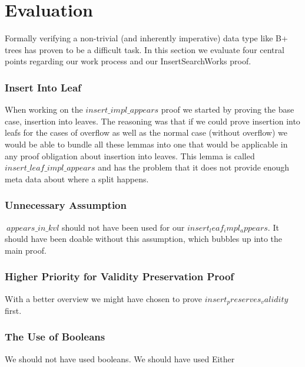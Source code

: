 \section{Evaluation}
\label{sec:Evaluation}
Formally verifying a non-trivial (and inherently imperative) data type like B+ trees has proven to be a difficult task. In this section we evaluate four central points regarding our work process and our InsertSearchWorks proof.
\subsubsection{Insert Into Leaf}
When working on the $insert\_impl\_appears$ proof we started by proving the base case, insertion into leaves. The reasoning was that if we could prove insertion into leafs for the cases of overflow as well as the normal case (without overflow) we would be able to bundle all these lemmas into one that would be applicable in any proof obligation about insertion into leaves. This lemma is called $insert\_leaf\_impl\_appears$ and has the problem that it does not provide enough meta data about where a split happens.
\subsubsection{Unnecessary Assumption}
$~appears\_in\_kvl$ should not have been used for our $insert_leaf_impl_appears$. It should have been doable without this assumption, which bubbles up into the main proof.
\subsubsection{Higher Priority for Validity Preservation Proof}
With a better overview we might have chosen to prove $insert_preserves_validity$ first.
\subsubsection{The Use of Booleans}
We should not have used booleans. We should have used Either